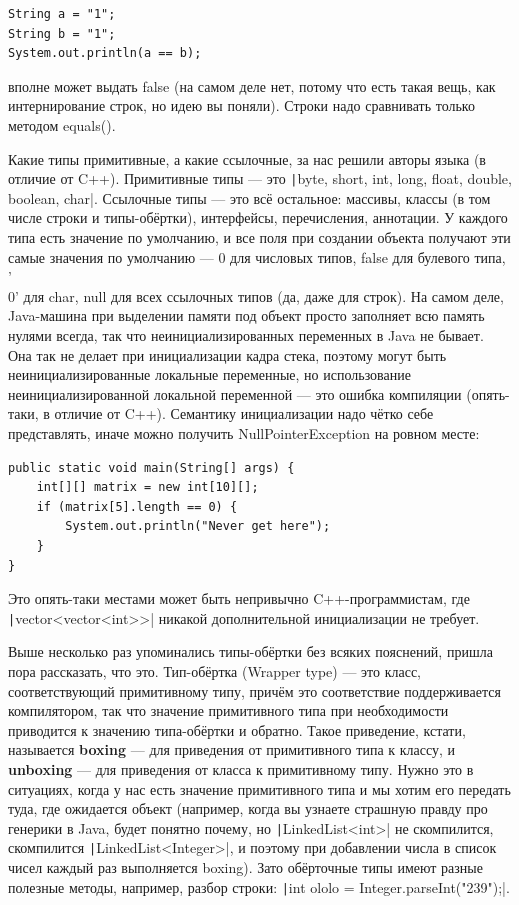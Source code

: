 \documentclass[a5paper]{article}
\begin{document}
\begin{verbatim}
String a = "1";
String b = "1";
System.out.println(a == b);
\end{verbatim}

вполне может выдать false (на самом деле нет, потому что есть такая вещь, как интернирование строк, но идею вы поняли). Строки надо сравнивать только методом equals().

Какие типы примитивные, а какие ссылочные, за нас решили авторы языка (в отличие от C++). Примитивные типы --- это \texttt|byte, short, int, long, float, double, boolean, char|. Ссылочные типы --- это всё остальное: массивы, классы (в том числе строки и типы-обёртки), интерфейсы, перечисления, аннотации. У каждого типа есть значение по умолчанию, и все поля при создании объекта получают эти самые значения по умолчанию --- 0 для числовых типов, false для булевого типа, '\\0' для char, null для всех ссылочных типов (да, даже для строк). На самом деле, Java-машина при выделении памяти под объект просто заполняет всю память нулями всегда, так что неинициализированных переменных в Java не бывает. Она так не делает при инициализации кадра стека, поэтому могут быть неинициализированные локальные переменные, но использование неинициализированной локальной переменной --- это ошибка компиляции (опять-таки, в отличие от C++). Семантику инициализации надо чётко себе представлять, иначе можно получить NullPointerException на ровном месте:

\begin{verbatim}
public static void main(String[] args) {
    int[][] matrix = new int[10][];
    if (matrix[5].length == 0) {
        System.out.println("Never get here");
    }
}
\end{verbatim}

Это опять-таки местами может быть непривычно C++-программистам, где \texttt|vector<vector<int>>| никакой дополнительной инициализации не требует.

Выше несколько раз упоминались типы-обёртки без всяких пояснений, пришла пора рассказать, что это. Тип-обёртка (Wrapper type) --- это класс, соответствующий примитивному типу, причём это соответствие поддерживается компилятором, так что значение примитивного типа при необходимости приводится к значению типа-обёртки и обратно. Такое приведение, кстати, называется \textbf{boxing} --- для приведения от примитивного типа к классу, и \textbf{unboxing} --- для приведения от класса к примитивному типу. Нужно это в ситуациях, когда у нас есть значение примитивного типа и мы хотим его передать туда, где ожидается объект (например, когда вы узнаете страшную правду про генерики в Java, будет понятно почему, но \texttt|LinkedList<int>| не скомпилится, скомпилится \texttt|LinkedList<Integer>|, и поэтому при добавлении числа в список чисел каждый раз выполняется boxing). Зато обёрточные типы имеют разные полезные методы, например, разбор строки: \texttt|int ololo = Integer.parseInt("239");|.
\end{document}
